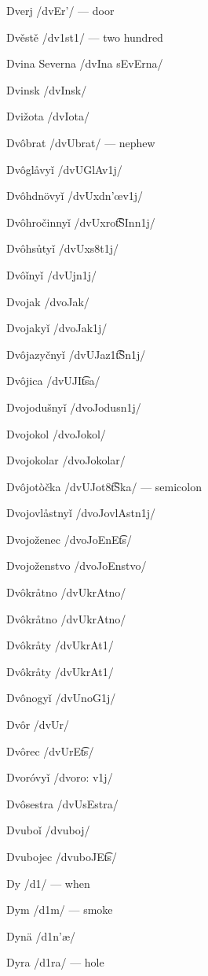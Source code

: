 Dverj /dvEr’/ — door

Dvěstě /dv1st1/ — two hundred

Dvina Severna /dvIna sEvErna/

Dvinsk /dvInsk/

Dvižota /dvI\textctz  ota/

Dvôbrat /dvUbrat/ — nephew

Dvôglåvyǐ /dvUGlAv1j/

Dvôhdnövyǐ /dvUxdn’œv1j/

Dvôhročinnyǐ /dvUxro\t{tS}Inn1j/

Dvôhsůtyǐ /dvUxs8t1j/

Dvôǐnyǐ /dvUjn1j/

Dvojak /dvoJak/

Dvojakyǐ /dvoJak1j/

Dvôjazyčnyǐ /dvUJaz1\t{tS}n1j/

Dvôjica /dvUJI\t{ts}a/

Dvojodušnyǐ /dvoJodu\:sn1j/

Dvojokol /dvoJokol/

Dvojokolar /dvoJokolar/

Dvôjotòčka /dvUJot8\t{tS}ka/ — semicolon

Dvojovlåstnyǐ /dvoJovlAstn1j/

Dvojoženec /dvoJo\textctz  EnE\t{ts}/

Dvojoženstvo /dvoJo\textctz  Enstvo/

Dvôkråtno /dvUkrAtno/

Dvôkråtno /dvUkrAtno/

Dvôkråty /dvUkrAt1/

Dvôkråty /dvUkrAt1/

Dvônogyǐ /dvUnoG1j/

Dvôr /dvUr/

Dvôrec /dvUrE\t{ts}/

Dvoróvyǐ /dvoro: v1j/

Dvôsestra /dvUsEstra/

Dvuboǐ /dvuboj/

Dvubojec /dvuboJE\t{ts}/

Dy /d1/ — when

Dym /d1m/ — smoke

Dynä /d1n’æ/

Dyra /d1ra/ — hole

